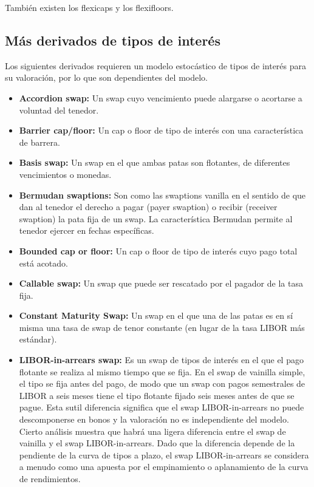 También existen los flexicaps y los flexifloors.



\subsection{Más derivados de tipos de interés}

Los siguientes derivados requieren un modelo estocástico de tipos de interés para su valoración, por lo que son dependientes del modelo.

\begin{itemize}
    \item \textbf{Accordion swap:} Un swap cuyo vencimiento puede alargarse o acortarse a voluntad del tenedor.
    \item \textbf{Barrier cap/floor:} Un cap o floor de tipo de interés con una característica de barrera.
    \item \textbf{Basis swap:} Un swap en el que ambas patas son flotantes, de diferentes vencimientos o monedas.
    \item \textbf{Bermudan swaptions:} Son como las swaptions vanilla en el sentido de que dan al tenedor el derecho a pagar (payer swaption) o recibir (receiver swaption) la pata fija de un swap. La característica Bermudan permite al tenedor ejercer en fechas específicas.
    \item \textbf{Bounded cap or floor:} Un cap o floor de tipo de interés cuyo pago total está acotado.
    \item \textbf{Callable swap:} Un swap que puede ser rescatado por el pagador de la tasa fija.
    \item \textbf{Constant Maturity Swap:} Un swap en el que una de las patas es en sí misma una tasa de swap de tenor constante (en lugar de la tasa LIBOR más estándar).
    \item \textbf{LIBOR-in-arrears swap:} Es un swap de tipos de interés en el que el pago flotante se realiza al mismo tiempo que se fija. En el swap de vainilla simple, el tipo se fija antes del pago, de modo que un swap con pagos semestrales de LIBOR a seis meses tiene el tipo flotante fijado seis meses antes de que se pague. Esta sutil diferencia significa que el swap LIBOR-in-arrears no puede descomponerse en bonos y la valoración no es independiente del modelo. Cierto análisis muestra que habrá una ligera diferencia entre el swap de vainilla y el swap LIBOR-in-arrears. Dado que la diferencia depende de la pendiente de la curva de tipos a plazo, el swap LIBOR-in-arrears se considera a menudo como una apuesta por el empinamiento o aplanamiento de la curva de rendimientos.

\end{itemize}
